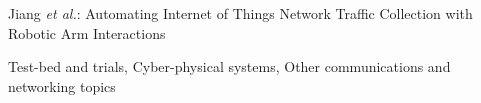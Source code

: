 \documentclass[journal]{IEEEtran}
\begin{document}
\markboth{}%
{Jiang \MakeLowercase{\textit{et al.}}: Automating Internet of Things Network Traffic Collection with Robotic Arm Interactions}


%



\maketitle

\begin{abstract}

\end{abstract}

\begin{IEEEkeywords}
Test-bed and trials, Cyber-physical systems, Other communications and networking topics
\end{IEEEkeywords}

%
\IEEEpeerreviewmaketitle










\end{document}
